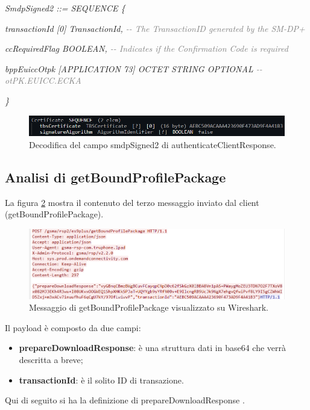 \documentclass[10pt, oneside]{book}
\begin{document}
\textit{SmdpSigned2 ::= SEQUENCE \{}

\hspace{0.75cm} \textit{transactionId [0] TransactionId, \textcolor{gray}{{-}{-} The TransactionID generated by the SM-DP+}}

\hspace{0.75cm} \textit{ccRequiredFlag BOOLEAN, \textcolor{gray}{{-}{-} Indicates if the Confirmation Code is required}}

\hspace{0.75cm} \textit{bppEuiccOtpk [APPLICATION 73] OCTET STRING OPTIONAL \textcolor{gray}{{-}{-} otPK.EUICC.ECKA}}

\textit{\}\\}

\begin{figure}
\includegraphics[width=\linewidth]{decode-smdpSigned2.png}
\caption{Decodifica del campo smdpSigned2 di authenticateClientResponse.}
\label{fig:decode-smdpSigned2}
\end{figure}

\subsection{Analisi di getBoundProfilePackage}
La figura \ref{fig:msg5-stream-pcap} mostra il contenuto del terzo messaggio inviato dal client (getBoundProfilePackage).\\
\begin{figure}
\includegraphics[width=\linewidth]{msg5-stream-pcap.png}
\caption{Messaggio di getBoundProfilePackage visualizzato su Wireshark.}
\label{fig:msg5-stream-pcap}
\end{figure}
Il payload è composto da due campi:
\begin{itemize}
\item \textbf{prepareDownloadResponse}: è una struttura dati in base64 che verrà descritta a breve;
\item \textbf{transactionId}: è il solito ID di transazione.
\end{itemize}
Qui di seguito si ha la definizione di prepareDownloadResponse \cite{RSP-definitions}.\\
\end{document}
